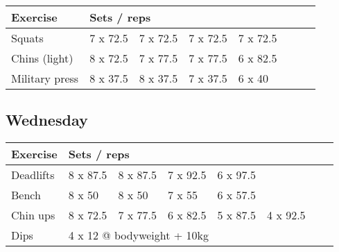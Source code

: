\documentclass[12pt, a4paper]{article}%
\begin{document}
  \begin{tabular}{l|lllllll}
  \hspace{0.75em} \textbf{Exercise} & \multicolumn{ 7 }{l}{ \textbf{Sets / reps} } \\ \hline

            \hspace{0.75em} Squats
            & 7 x 72.5
            & 7 x 72.5
            & 7 x 72.5
            & 7 x 72.5
            & 
            & 
            & 
            \\


            \hspace{0.75em} Chins (light)
            & 8 x 72.5
            & 7 x 77.5
            & 7 x 77.5
            & 6 x 82.5
            & 
            & 
            & 
            \\


            \hspace{0.75em} Military press
            & 8 x 37.5
            & 8 x 37.5
            & 7 x 37.5
            & 6 x 40
            & 
            & 
            & 
            \\


  \end{tabular}

  \subsection*{\hspace{0.5em} Wednesday }


  \begin{tabular}{l|lllllll}
  \hspace{0.75em} \textbf{Exercise} & \multicolumn{ 7 }{l}{ \textbf{Sets / reps} } \\ \hline

            \hspace{0.75em} Deadlifts
            & 8 x 87.5
            & 8 x 87.5
            & 7 x 92.5
            & 6 x 97.5
            & 
            & 
            & 
            \\


            \hspace{0.75em} Bench
            & 8 x 50
            & 8 x 50
            & 7 x 55
            & 6 x 57.5
            & 
            & 
            & 
            \\


            \hspace{0.75em} Chin ups
            & 8 x 72.5
            & 7 x 77.5
            & 6 x 82.5
            & 5 x 87.5
            & 4 x 92.5
            & 
            & 
            \\


   \hspace{0.75em} Dips &  \multicolumn{ 7 }{l}{ 4 x 12 @ bodyweight + 10kg } \\
  \end{tabular}
\end{document}
